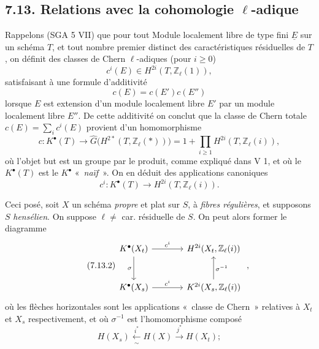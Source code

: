 \subsection*{7.13. Relations avec la cohomologie \(\ell\)-adique}
Rappelons (SGA 5 VII) que pour tout Module localement libre de type fini \(\underline{E}\) sur un schéma \(T\), et tout nombre premier distinct des caractéristiques résiduelles de \(T\), on définit des classes de Chern \(\ell\)-adiques (pour \(i\geq 0\))
\[
  c^i(E)\in H^{2i}(T,\mathbb Z_\ell(1)),
\]
satisfaisant à une formule d'additivité
\[
  c(E)=c(E')c(E'')
\]
lorsque \(E\) est extension d'un module localement libre \(E'\) par un module localement libre \(E''\). De cette additivité on conclut que la classe de Chern totale \(c(E)=\sum_i c^i(E)\) provient d'un homomorphisme
\begin{equation}\tag{7.13.0}
  c:K^\bullet(T)\longrightarrow
  \widehat G\bigl(H^{2*}(T,\mathbb Z_\ell(*))\bigr)
  =
  1+\prod_{i\geq 1}H^{2i}(T,\mathbb Z_\ell(i)),
\end{equation}
où l'objet but est un groupe par le produit, comme expliqué dans V 1, et où le \(K^\bullet(T)\) est le \(K^\bullet\) «~\emph{naïf}~». On en déduit des applications canoniques
\begin{equation}\tag{7.13.1}
  c^i:K^\bullet(T)\longrightarrow H^{2i}(T,\mathbb Z_\ell(i)).
\end{equation}

Ceci posé, soit \(X\) un schéma \emph{propre} et plat sur \(S\), à \emph{fibres régulières}, et supposons \(S\) \emph{hensélien}. On suppose \(\ell\neq\) car. résiduelle de \(S\). On peut alors former le diagramme
\begin{equation}\tag{7.13.2}
\begin{tikzcd}[column sep=large,row sep=large]
K^\bullet(X_t) \arrow[r,"c^i"] \arrow[d,"\sigma"'] &
H^{2i}(X_t,\mathbb Z_\ell(i))\\
K^\bullet(X_s) \arrow[r,"c^i"] &
K^{2i}(X_s,\mathbb Z_\ell(i)) \arrow[u,"\sigma^{-1}"']
\end{tikzcd}
\;,
\end{equation}
où les flèches horizontales sont les applications «~classe de Chern~» relatives à \(X_t\) et \(X_s\) respectivement, et où \(\sigma^{-1}\) est l'homomorphisme composé
\[
  H(X_s)\xleftarrow[\sim]{i^*}H(X)\xrightarrow{j^*}H(X_t);
\]
